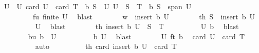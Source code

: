 \begin{isabellebody}
\ U\ \ U{\isacharcolon}{\kern0pt}\ {\isachardoublequoteopen}card\ U\ {\isacharequal}{\kern0pt}\ card\ {\isacharparenleft}{\kern0pt}T\ {\isacharminus}{\kern0pt}\ {\isacharbraceleft}{\kern0pt}b{\isacharbraceright}{\kern0pt}{\isacharparenright}{\kern0pt}{\isachardoublequoteclose}\ {\isachardoublequoteopen}S\ {\isasymsubseteq}\ U{\isachardoublequoteclose}\ {\isachardoublequoteopen}U\ {\isasymsubseteq}\ S\ {\isasymunion}\ {\isacharparenleft}{\kern0pt}T\ {\isacharminus}{\kern0pt}\ {\isacharbraceleft}{\kern0pt}b{\isacharbraceright}{\kern0pt}{\isacharparenright}{\kern0pt}{\isachardoublequoteclose}\ {\isachardoublequoteopen}S\ {\isasymsubseteq}\ span\ U{\isachardoublequoteclose}\isanewline
\ \ \ \ \ \ \ \ \ fu{\isacharcolon}{\kern0pt}\ {\isachardoublequoteopen}finite\ U{\isachardoublequoteclose}\ \isamarkupfalse%
\ blast\isanewline
\ \ \ \ \ \ \isamarkupfalse%
\ {\isacharquery}{\kern0pt}w\ {\isacharequal}{\kern0pt}\ {\isachardoublequoteopen}insert\ b\ U{\isachardoublequoteclose}\isanewline
\ \ \ \ \ \ \isamarkupfalse%
\ th{}{\isacharcolon}{\kern0pt}\ {\isachardoublequoteopen}S\ {\isasymsubseteq}\ insert\ b\ U{\isachardoublequoteclose}\isanewline
\ \ \ \ \ \ \ \ \isamarkupfalse%
\ U\ \isamarkupfalse%
\ blast\isanewline
\ \ \ \ \ \ \isamarkupfalse%
\ th{}{\isacharcolon}{\kern0pt}\ {\isachardoublequoteopen}insert\ b\ U\ {\isasymsubseteq}\ S\ {\isasymunion}\ T{\isachardoublequoteclose}\isanewline
\ \ \ \ \ \ \ \ \isamarkupfalse%
\ U\ b\ \isamarkupfalse%
\ blast\isanewline
\ \ \ \ \ \ \isamarkupfalse%
\ bu{\isacharcolon}{\kern0pt}\ {\isachardoublequoteopen}b\ {\isasymnotin}\ U{\isachardoublequoteclose}\isanewline
\ \ \ \ \ \ \ \ \isamarkupfalse%
\ b\ U\ \isamarkupfalse%
\ blast\isanewline
\ \ \ \ \ \ \isamarkupfalse%
\ U{\isacharparenleft}{\kern0pt}{}{\isacharparenright}{\kern0pt}\ ft\ b\ \isamarkupfalse%
\ {\isachardoublequoteopen}card\ U\ {\isacharequal}{\kern0pt}\ {\isacharparenleft}{\kern0pt}card\ T\ {\isacharminus}{\kern0pt}\ {}{\isacharparenright}{\kern0pt}{\isachardoublequoteclose}\isanewline
\ \ \ \ \ \ \ \ \isamarkupfalse%
\ auto\isanewline
\ \ \ \ \ \ \isamarkupfalse%
\ \isamarkupfalse%
\ th{}{\isacharcolon}{\kern0pt}\ {\isachardoublequoteopen}card\ {\isacharparenleft}{\kern0pt}insert\ b\ U{\isacharparenright}{\kern0pt}\ {\isacharequal}{\kern0pt}\ card\ T{\isachardoublequoteclose}\isanewline

\end{isabellebody}
